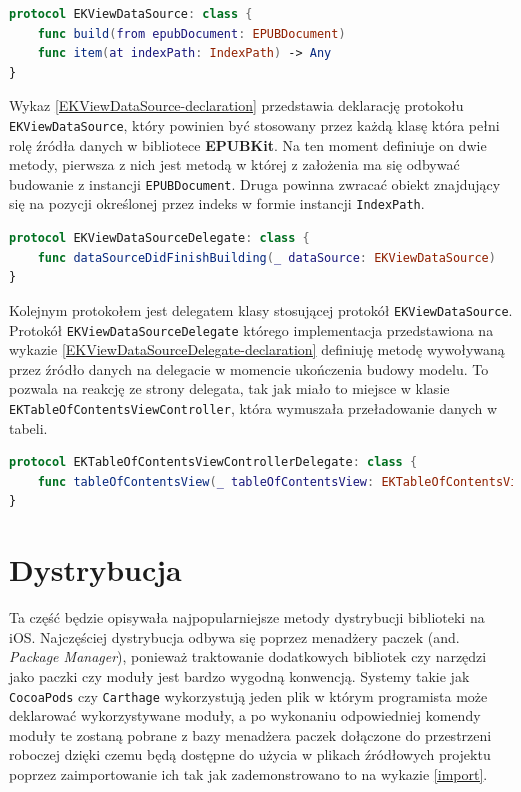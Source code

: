 \begin{lstlisting}[language=swift,caption={Deklaracja protokołu \texttt{EKViewDataSource}}, label=EKViewDataSource-declaration]
protocol EKViewDataSource: class {
    func build(from epubDocument: EPUBDocument)
    func item(at indexPath: IndexPath) -> Any
}
\end{lstlisting}

Wykaz \ref{EKViewDataSource-declaration} przedstawia deklarację protokołu \texttt{EKViewDataSource}, który powinien być stosowany przez każdą klasę która pełni rolę źródła danych w bibliotece \textbf{EPUBKit}. Na ten moment definiuje on dwie metody, pierwsza z nich jest metodą w której z założenia ma się odbywać budowanie z instancji \texttt{EPUBDocument}. Druga powinna zwracać obiekt znajdujący się na pozycji określonej przez indeks w formie instancji \texttt{IndexPath}.

\begin{lstlisting}[language=swift,caption={Deklaracja protokołu \texttt{EKViewDataSourceDelegate}}, label=EKViewDataSourceDelegate-declaration]
protocol EKViewDataSourceDelegate: class {
    func dataSourceDidFinishBuilding(_ dataSource: EKViewDataSource)
}
\end{lstlisting}

Kolejnym protokołem jest delegatem klasy stosującej protokół \texttt{EKViewDataSource}. Protokół \texttt{EKViewDataSourceDelegate} którego implementacja przedstawiona na wykazie \ref{EKViewDataSourceDelegate-declaration} definiuję metodę wywoływaną przez źródło danych na delegacie w momencie ukończenia budowy modelu. To pozwala na reakcję ze strony delegata, tak jak miało to miejsce w klasie \texttt{EKTableOfContentsViewController}, która wymuszała przeładowanie danych w tabeli.

\begin{lstlisting}[language=swift,caption={Deklaracja protokołu \texttt{EKTableOfContentsViewControllerDelegate}}, label=EKTableOfContentsViewControllerDelegate-declaration]
protocol EKTableOfContentsViewControllerDelegate: class {
    func tableOfContentsView(_ tableOfContentsView: EKTableOfContentsViewController, didSelectRowAt indexPath: IndexPath)
}
\end{lstlisting}

\section{Dystrybucja}

Ta część będzie opisywała najpopularniejsze metody dystrybucji biblioteki na iOS. Najczęściej dystrybucja odbywa się poprzez menadżery paczek (and. \textit{Package Manager}), ponieważ traktowanie dodatkowych bibliotek czy narzędzi jako paczki czy moduły jest bardzo wygodną konwencją. Systemy takie jak \texttt{CocoaPods} czy \texttt{Carthage} wykorzystują jeden plik w którym programista może deklarować wykorzystywane moduły, a po wykonaniu odpowiedniej komendy moduły te zostaną pobrane z bazy menadżera paczek dołączone do przestrzeni roboczej dzięki czemu będą dostępne do użycia w plikach źródłowych projektu poprzez zaimportowanie ich tak jak zademonstrowano to na wykazie \ref{import}.

